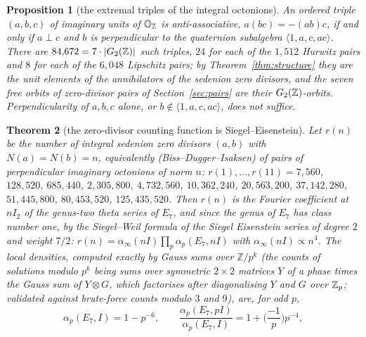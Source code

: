 \documentclass[11pt]{amsart}
\newtheorem{theorem}{Theorem}[section]
\newtheorem{proposition}[theorem]{Proposition}
\theoremstyle{definition}
\begin{document}
\begin{proposition}[the extremal triples of the integral octonions]\label{prop:triples}
An ordered triple $(a,b,c)$ of imaginary units of $\mathbb O_{\mathbb{Z}}$ is anti-associative, $a(bc)=-(ab)c$, if and only if $a\perp c$ and $b$ is perpendicular to the quaternion subalgebra $\langle1,a,c,ac\rangle$. There are $84{,}672=7\cdot|G_2(\mathbb{Z})|$ such triples, $24$ for each of the $1{,}512$ Hurwitz pairs and $8$ for each of the $6{,}048$ Lipschitz pairs; by Theorem~\ref{thm:structure} they are the unit elements of the annihilators of the sedenion zero divisors, and the seven free orbits of zero-divisor pairs of Section~\ref{sec:pairs} are their $G_2(\mathbb{Z})$-orbits. Perpendicularity of $a,b,c$ alone, or $b\notin\langle1,a,c,ac\rangle$, does not suffice.
\end{proposition}
\begin{theorem}[the zero-divisor counting function is Siegel--Eisenstein]\label{thm:count}
Let $r(n)$ be the number of integral sedenion zero divisors $(a,b)$ with $N(a)=N(b)=n$, equivalently (Biss--Dugger--Isaksen) of pairs of perpendicular imaginary octonions of norm $n$: $r(1),\dots,r(11)=7{,}560$, $128{,}520$, $685{,}440$, $2{,}305{,}800$, $4{,}732{,}560$, $10{,}362{,}240$, $20{,}563{,}200$, $37{,}142{,}280$, $51{,}445{,}800$, $80{,}453{,}520$, $125{,}435{,}520$. Then $r(n)$ is the Fourier coefficient at $nI_2$ of the genus-two theta series of $E_7$, and since the genus of $E_7$ has class number one, by the Siegel--Weil formula of the Siegel Eisenstein series of degree $2$ and weight $7/2$: $r(n)=\alpha_\infty(nI)\prod_p\alpha_p(E_7,nI)$ with $\alpha_\infty(nI)\propto n^4$. The local densities, computed exactly by Gauss sums over $\mathbb Z/p^k$ (the counts of solutions modulo $p^k$ being sums over symmetric $2\times2$ matrices $Y$ of a phase times the Gauss sum of $Y\otimes G$, which factorises after diagonalising $Y$ and $G$ over $\mathbb{Z}_p$; validated against brute-force counts modulo $3$ and $9$), are, for odd $p$,
\[\alpha_p(E_7,I)=1-p^{-6},\qquad \frac{\alpha_p(E_7,pI)}{\alpha_p(E_7,I)}=1+\Big(\frac{-1}{p}\Big)p^{-4},\]

\end{theorem}
\end{document}
